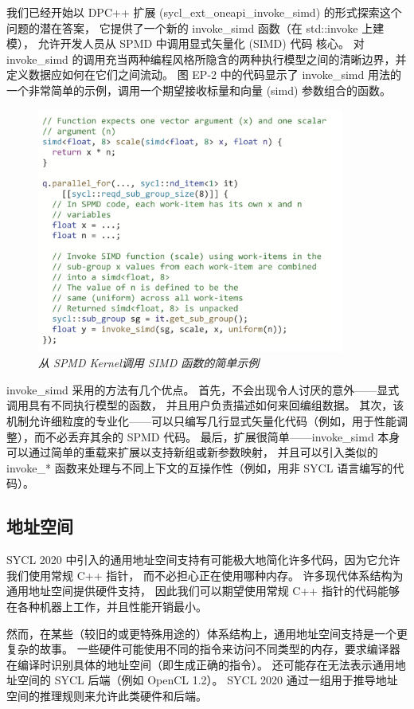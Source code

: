 我们已经开始以 DPC++ 扩展 (sycl\_ext\_oneapi\_invoke\_simd) 的形式探索这个问题的潜在答案，
它提供了一个新的 invoke\_simd 函数（在 std::invoke 上建模），
允许开发人员从 SPMD 中调用显式矢量化 (SIMD) 代码 核心。 
对invoke\_simd 的调用充当两种编程风格所隐含的两种执行模型之间的清晰边界，并定义数据应如何在它们之间流动。 
图 EP-2 中的代码显示了 invoke\_simd 用法的一个非常简单的示例，调用一个期望接收标量和向量 (simd) 参数组合的函数。

\begin{figure}[H]
	\centering
	\includegraphics[width=0.9\textwidth]{figs/F22.2.png}
	\caption{\textit{从 SPMD Kernel调用 SIMD 函数的简单示例 }}
\end{figure}

invoke\_simd 采用的方法有几个优点。 首先，不会出现令人讨厌的意外——显式调用具有不同执行模型的函数，
并且用户负责描述如何来回编组数据。 
其次，该机制允许细粒度的专业化——可以只编写几行显式矢量化代码（例如，用于性能调整），而不必丢弃其余的 SPMD 代码。 
最后，扩展很简单——invoke\_simd 本身可以通过简单的重载来扩展以支持新组或新参数映射，
并且可以引入类似的 invoke\_* 函数来处理与不同上下文的互操作性（例如，用非 SYCL 语言编写的代码）。

\subsection{地址空间}
SYCL 2020 中引入的通用地址空间支持有可能极大地简化许多代码，因为它允许我们使用常规 C++ 指针，
而不必担心正在使用哪种内存。 许多现代体系结构为通用地址空间提供硬件支持，
因此我们可以期望使用常规 C++ 指针的代码能够在各种机器上工作，并且性能开销最小。

然而，在某些（较旧的或更特殊用途的）体系结构上，通用地址空间支持是一个更复杂的故事。 
一些硬件可能使用不同的指令来访问不同类型的内存，要求编译器在编译时识别具体的地址空间（即生成正确的指令）。 
还可能存在无法表示通用地址空间的 SYCL 后端（例如 OpenCL 1.2）。 
SYCL 2020 通过一组用于推导地址空间的推理规则来允许此类硬件和后端。

